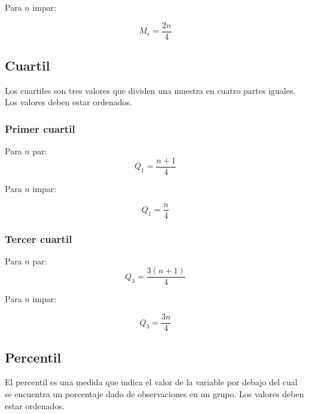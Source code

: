 \documentclass{report}
\begin{document}
          Para $n$ impar:

          \begin{equation*}
            M_e=\frac{2n}{4}
          \end{equation*}
       
        \subsection*{Cuartil}
          Los cuartiles son tres valores que dividen una muestra en cuatro partes
          iguales. Los valores deben estar ordenados.
          
          \subsubsection*{Primer cuartil}
          
            \indent Para $n$ par:
            \begin{equation*}
              Q_1=\frac{n+1}{4}
            \end{equation*}

            Para $n$ impar:

            \begin{equation*}
              Q_1=\frac{n}{4}
            \end{equation*}

          \subsubsection*{Tercer cuartil}
            
            \indent Para $n$ par:
            \begin{equation*}
              Q_3=\frac{3(n+1)}{4}
            \end{equation*}

            Para $n$ impar:

            \begin{equation*}
              Q_3=\frac{3n}{4}
            \end{equation*} 

        \subsection*{Percentil}
          El percentil es una medida que indica el valor de la variable por debajo 
          del cual se encuentra un porcentaje dado de observaciones en un grupo.
          Los valores deben estar ordenados.
\end{document}
